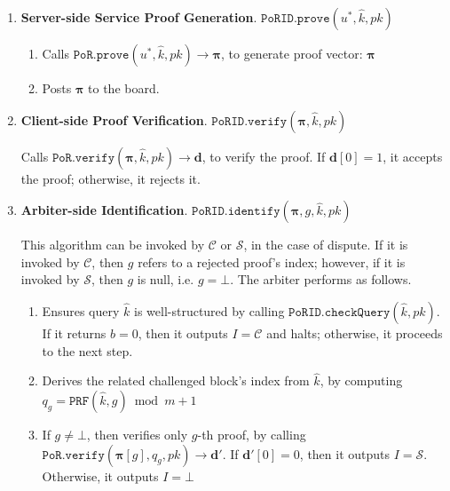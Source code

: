 \begin{enumerate}
\item\textbf{Server-side Service Proof Generation}. $\mathtt{PoRID.prove}(u^{\scriptscriptstyle *},\hat{k},pk)$ 
\begin{enumerate}
\item Calls $\mathtt{PoR.prove}(u^{\scriptscriptstyle *},\hat{k},pk)\rightarrow  {\bm{\pi}}$, to generate proof vector: $ {\bm{\pi}}$ 
\item Posts $ {\bm{\pi}}$ to the board. 
\end{enumerate}

\item\textbf{Client-side Proof Verification}. $\mathtt{PoRID.verify}( {\bm{\pi}},\hat{k} ,pk)$

 Calls $\mathtt{PoR.verify}( {\bm{\pi}},\hat{k} ,pk)\rightarrow  {\bm{d}}$, to verify the proof. If $ {\bm{d}}[0] = 1$,  it accepts the proof; otherwise, it rejects it.

\item\textbf{Arbiter-side Identification}. $\mathtt{PoRID.identify}( {\bm{\pi}}, g,\hat{k},pk)$ 

This algorithm can be invoked by $\mathcal{C}$ or $\mathcal{S}$, in the case of dispute. If it is invoked by $\mathcal{C}$, then $g$ refers to a rejected proof's  index; however, if it is invoked by $\mathcal{S}$, then $g$ is null, i.e.  $g=\bot$. The arbiter performs as follows. 


\begin{enumerate}


\item Ensures  query $\hat{k}$ is well-structured by calling $\mathtt{PoRID.checkQuery}(\hat{k}, pk)$. If it returns $b=0$, then it outputs $I=\mathcal C$ and halts; otherwise, it proceeds to the next step. 



\item Derives the related challenged block's index from $\hat{k}$, by computing $q_{\scriptscriptstyle g}=\mathtt{PRF}(\hat{k},g)\bmod m+1$ 



\item If $g\neq \bot$, then verifies only $g$-th proof, by calling $\mathtt{PoR.verify}( {\bm{\pi}}[g],q_{\scriptscriptstyle g},pk)\rightarrow  {\bm{d}}'$. If $ {\bm{d}}'[0]=0$, then it outputs $I=\mathcal S$. Otherwise, it outputs $I=\bot$
\end{enumerate}
\end{enumerate}


